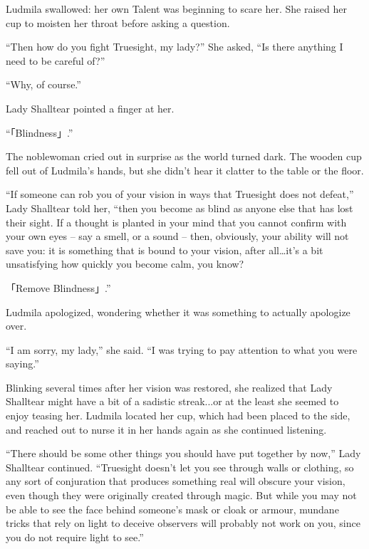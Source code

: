  

Ludmila swallowed: her own Talent was beginning to scare her. She raised her cup to moisten her throat before asking a question.

 

“Then how do you fight Truesight, my lady?” She asked, “Is there anything I need to be careful of?”

 

“Why, of course.”

 

Lady Shalltear pointed a finger at her.

 

“「Blindness」.”

 

The noblewoman cried out in surprise as the world turned dark. The wooden cup fell out of Ludmila’s hands, but she didn’t hear it clatter to the table or the floor.

 

“If someone can rob you of your vision in ways that Truesight does not defeat,” Lady Shalltear told her, “then you become as blind as anyone else that has lost their sight. If a thought is planted in your mind that you cannot confirm with your own eyes – say a smell, or a sound – then, obviously, your ability will not save you: it is something that is bound to your vision, after all…it’s a bit unsatisfying how quickly you become calm, you know?

 

「Remove Blindness」.”

 

Ludmila apologized, wondering whether it was something to actually apologize over.

 

“I am sorry, my lady,” she said. “I was trying to pay attention to what you were saying.”

 

Blinking several times after her vision was restored, she realized that Lady Shalltear might have a bit of a sadistic streak...or at the least she seemed to enjoy teasing her. Ludmila located her cup, which had been placed to the side, and reached out to nurse it in her hands again as she continued listening.

 

“There should be some other things you should have put together by now,” Lady Shalltear continued. “Truesight doesn’t let you see through walls or clothing, so any sort of conjuration that produces something real will obscure your vision, even though they were originally created through magic. But while you may not be able to see the face behind someone’s mask or cloak or armour, mundane tricks that rely on light to deceive observers will probably not work on you, since you do not require light to see.”

